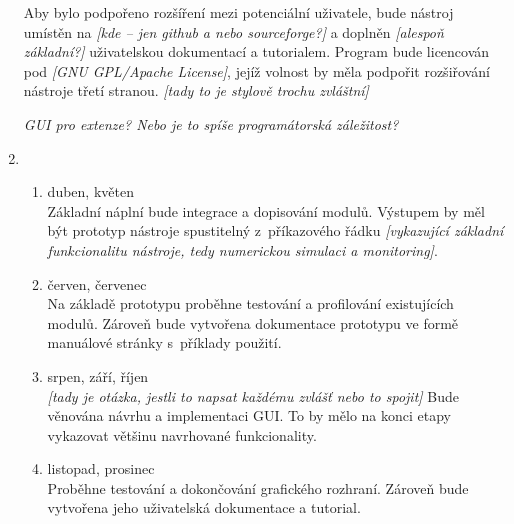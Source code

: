 \documentclass[a4paper]{article}
\begin{document}
\begin{enumerate}
	Aby bylo podpořeno rozšíření mezi potenciální uživatele, bude nástroj umístěn na \emph{[kde -- jen github a nebo sourceforge?]} a doplněn \emph{[alespoň základní?]} uživatelskou dokumentací
	a tutorialem. Program bude licencován pod \emph{[GNU GPL/Apache License]}, jejíž volnost by měla podpořit rozšiřování nástroje třetí stranou. \emph{[tady to je stylově trochu zvláštní]}

	\emph{GUI pro extenze? Nebo je to spíše programátorská záležitost?}

\item\begin{enumerate}
	\item duben, květen\\
		Základní náplní bude integrace a dopisování modulů. Výstupem by měl být prototyp nástroje spustitelný z~příkazového řádku \emph{[vykazující základní funkcionalitu nástroje,
		tedy numerickou simulaci a monitoring]}.
	\item červen, červenec\\
		Na základě prototypu proběhne testování a profilování existujících modulů.
		Zároveň bude vytvořena dokumentace prototypu ve formě manuálové stránky s~příklady použití.
	\item srpen, září, říjen\\ \emph{[tady je otázka, jestli to napsat každému zvlášť nebo to spojit]}
		Bude věnována návrhu a implementaci GUI. To by mělo na konci etapy vykazovat většinu navrhované funkcionality.
	\item listopad, prosinec\\
		Proběhne testování a dokončování grafického rozhraní. Zároveň bude vytvořena jeho uživatelská dokumentace a tutorial.
	\end{enumerate}
\end{enumerate}
\end{document}
